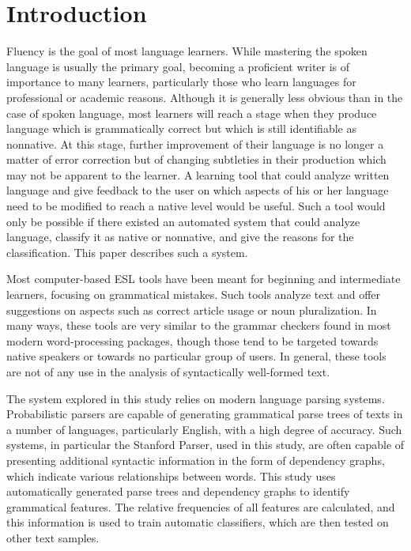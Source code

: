 \documentclass[main.tex]{subfiles}
\begin{document}
\section{Introduction}
\setcounter{section}{1}
Fluency is the goal of most language learners. While mastering the spoken language is usually the primary goal, becoming a proficient writer is of importance to many learners, particularly those who learn languages for professional or academic reasons. Although it is generally less obvious than in the case of spoken language, most learners will reach a stage when they produce language which is grammatically correct but which is still identifiable as nonnative. At this stage, further improvement of their language is no longer a matter of error correction but of changing subtleties in their production which may not be apparent to the learner. A learning tool that could analyze written language and give feedback to the user on which aspects of his or her language need to be modified to reach a native level would be useful. Such a tool would only be possible if there existed an automated system that could analyze language, classify it as native or nonnative, and give the reasons for the classification. This paper describes such a system.

Most computer-based ESL tools have been meant for beginning and intermediate learners, focusing on grammatical mistakes. Such tools analyze text and offer suggestions on aspects such as correct article usage or noun pluralization. In many ways, these tools are very similar to the grammar checkers found in most modern word-processing packages, though those tend to be targeted towards native speakers or towards no particular group of users. In general, these tools are not of any use in the analysis of syntactically well-formed text.

\begin{comment}
The classification of text documents is a fairly mature technology, often used in categorizing medical and business documents. Little work has been done in applying this technology to second language learning.
\end{comment}

The system explored in this study relies on modern language parsing systems. Probabilistic parsers are capable of generating grammatical parse trees of texts in a number of languages, particularly English, with a high degree of accuracy. Such systems, in particular the Stanford Parser, used in this study, are often capable of presenting additional syntactic information in the form of dependency graphs, which indicate various relationships between words. This study uses automatically generated parse trees and dependency graphs to identify grammatical features. The relative frequencies of all features are calculated, and this information is used to train automatic classifiers, which are then tested on other text samples. 
\end{document}
